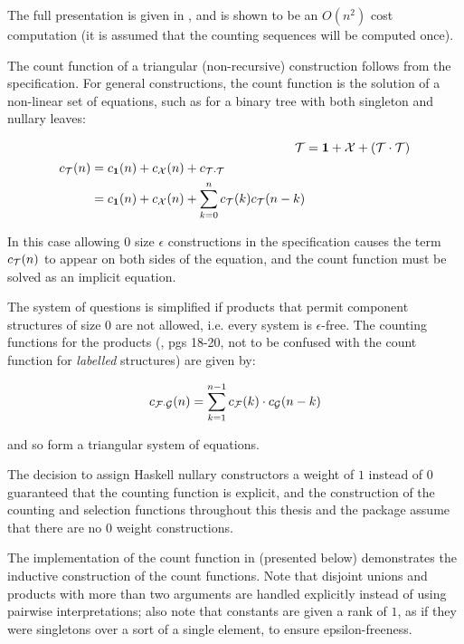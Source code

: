 \noindent 
The full presentation is given in  \cite{FlajoletZC94}, 
and is shown to be an $O(n^{2})$ cost computation
(it is assumed that the counting sequences will be computed once).

The count function of a triangular (non-recursive) construction follows from the specification.
For general constructions, the count function is the solution of a non-linear set of equations,
such as for a binary tree with both singleton and nullary leaves:

\begin{align*}
\mathcal{T} & = \mathbf{1} + \mathcal{X} + (\mathcal{T} \cdot \mathcal{T}) \\
\begin{split}
c_{\mathcal{T}}(n) & = c_{\mathbf{1}}(n) + c_{\mathcal{X}}(n) + c_{\mathcal{T} \cdot \mathcal{T}} \\
 & = c_{\mathbf{1}}(n) + c_{\mathcal{X}}(n) + \sum_{k=0}^{n} c_{\mathcal{T}}(k) c_{\mathcal{T}}(n-k)
\end{split}
\end{align*}

\noindent
In this case allowing $0$ size $\epsilon$ constructions in the specification
causes the term $c_{\mathcal{T}}(n)$ to appear on both sides of the equation,
and the count function must be solved as an implicit equation.

The system of questions is simplified if products that permit component structures of size 0 are not allowed,
i.e. every system is $\epsilon$-free.
The counting functions for the products 
(\cite{FlSaZi91}, pgs 18-20, not to be confused with the count function for \emph{labelled} structures)
are given by:

$$ c_{\mathcal{F} \cdot \mathcal{G}}(n) = \sum_{k=1}^{n-1} c_{\mathcal{F}}(k) \cdot c_{\mathcal{G}}(n-k) $$

\noindent
and so form a triangular system of equations.

The decision to assign Haskell nullary constructors a weight of $1$ instead of $0$
guaranteed that the counting function is explicit,
and the construction of the counting and selection functions throughout this thesis
and the \GC package assume that there are no $0$ weight constructions.

The implementation of the count function in \GC (presented below)
demonstrates the inductive construction of the count functions.
Note that disjoint unions and products with more than two arguments
are handled explicitly instead of using pairwise interpretations;
also note that constants are given a rank of $1$,
as if they were singletons over a sort of a single element,
to ensure epsilon-freeness.

